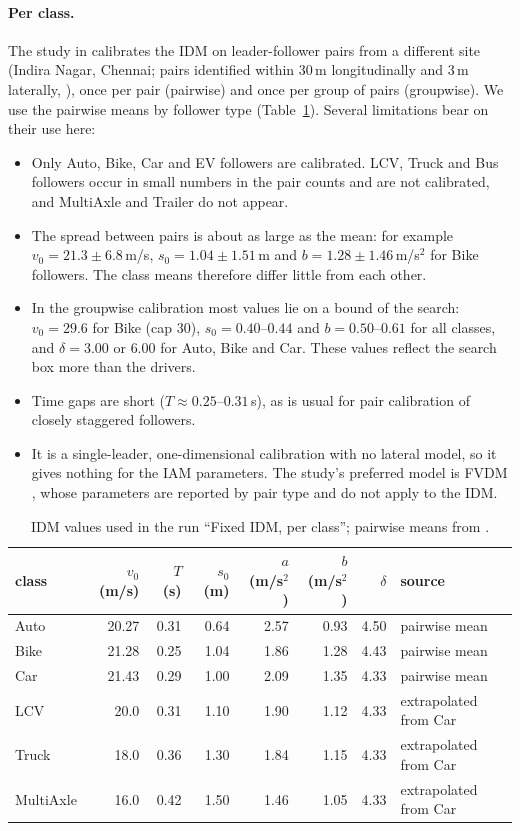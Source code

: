 \documentclass[11pt]{article}
\begin{document}
\paragraph{Per class.} The study in \cite{duggal} calibrates the IDM on
leader-follower pairs from a different site (Indira Nagar, Chennai; pairs
identified within 30\,m longitudinally and 3\,m laterally,
\cite[slide~7]{duggal}), once per pair (pairwise) and once per group of pairs
(groupwise). We use the pairwise means by follower type \cite[slide~10]{duggal}
(Table~\ref{tab:duggal}). Several limitations bear on their use here:
\begin{itemize}\setlength{\itemsep}{1pt}
\item Only Auto, Bike, Car and EV followers are calibrated. LCV, Truck and Bus
followers occur in small numbers in the pair counts \cite[slide~8]{duggal} and
are not calibrated, and MultiAxle and Trailer do not appear.
\item The spread between pairs is about as large as the mean: for example
$v_0=21.3\pm6.8$\,m/s, $s_0=1.04\pm1.51$\,m and $b=1.28\pm1.46$\,m/s$^2$ for
Bike followers. The class means therefore differ little from each other.
\item In the groupwise calibration \cite[slide~10]{duggal} most values lie on a
bound of the search:
$v_0=29.6$ for Bike (cap 30), $s_0=0.40$--$0.44$ and $b=0.50$--$0.61$ for all
classes, and $\delta=3.00$ or $6.00$ for Auto, Bike and Car. These values reflect
the search box more than the drivers.
\item Time gaps are short ($T\approx0.25$--$0.31$\,s), as is usual for pair
calibration of closely staggered followers.
\item It is a single-leader, one-dimensional calibration with no lateral model,
so it gives nothing for the IAM parameters. The study's preferred model is
FVDM \cite[slides~23--24]{duggal}, whose parameters are reported by pair type and
do not apply to the IDM.
\end{itemize}

\begin{table}[H]\centering\footnotesize
\caption{IDM values used in the run ``Fixed IDM, per class''; pairwise means
from \cite[slide~10]{duggal}.}
\label{tab:duggal}
\begin{tabular}{@{}lrrrrrrl@{}}
\toprule
class & $v_0$ (m/s) & $T$ (s) & $s_0$ (m) & $a$ (m/s$^2$) & $b$ (m/s$^2$) & $\delta$ & source\\
\midrule
Auto & 20.27 & 0.31 & 0.64 & 2.57 & 0.93 & 4.50 & pairwise mean \cite{duggal}\\
Bike & 21.28 & 0.25 & 1.04 & 1.86 & 1.28 & 4.43 & pairwise mean \cite{duggal}\\
Car & 21.43 & 0.29 & 1.00 & 2.09 & 1.35 & 4.33 & pairwise mean \cite{duggal}\\
LCV & 20.0 & 0.31 & 1.10 & 1.90 & 1.12 & 4.33 & extrapolated from Car\\
Truck & 18.0 & 0.36 & 1.30 & 1.84 & 1.15 & 4.33 & extrapolated from Car\\
MultiAxle & 16.0 & 0.42 & 1.50 & 1.46 & 1.05 & 4.33 & extrapolated from Car\\
\bottomrule
\end{tabular}
\end{table}
\end{document}
